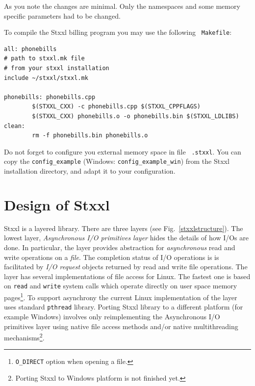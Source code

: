 \documentclass[twoside]{book}
\newcommand{\stxxl}{{\sc Stxxl} }
\begin{document}
As you note the changes are minimal. Only the namespaces and some
memory specific parameters had to be changed.

To compile the \stxxl billing program you may use the following {\tt
Makefile}: 


\begin{verbatim}
all: phonebills
# path to stxxl.mk file
# from your stxxl installation
include ~/stxxl/stxxl.mk

phonebills: phonebills.cpp
        $(STXXL_CXX) -c phonebills.cpp $(STXXL_CPPFLAGS)
        $(STXXL_CXX) phonebills.o -o phonebills.bin $(STXXL_LDLIBS)
clean:
        rm -f phonebills.bin phonebills.o
\end{verbatim}


Do not forget to configure you external memory space in file {\tt
.stxxl}. You can copy the {\tt config\_example} (Windows: {\tt config\_example\_win}) from the \stxxl
installation directory, and adapt it to your configuration.




\chapter{Design of \stxxl}

\stxxl is a layered library. There are three layers (see
Fig.~\ref{stxxlstructure}). The lowest layer, 
\emph{Asynchronous I/O primitives layer} hides the details of how I/Os
are done. In particular, the layer provides abstraction for
\emph{asynchronous} read and write operations on a \emph{file}. The
completion status of I/O operations is  
is facilitated by \emph{I/O request} objects returned by
read and write file operations. 
The layer has several implementations of file access for Linux. The
fastest one is based on {\tt read} and {\tt write} system calls which
operate directly on user space memory pages\footnote{{\tt O\_DIRECT}
option when opening a file.}.
To support asynchrony the current
Linux implementation of the layer uses standard {\tt pthread} library.
Porting \stxxl library to a different platform (for example
Windows) involves only reimplementing the Asynchronous I/O primitives
layer using native file access methods and/or native
multithreading mechanisms\footnote{Porting \stxxl to Windows platform
is not finished yet.}.
\end{document}
